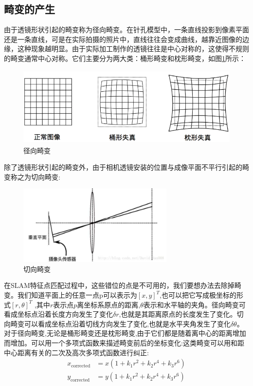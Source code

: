 \subsection{畸变的产生}
由于透镜形状引起的畸变称为径向畸变。在针孔模型中，一条直线投影到像素平面还是一条直线，可是在实际拍摄的照片中，直线往往会变成曲线，越靠近图像的边缘，这种现象越明显。由于实际加工制作的透镜往往是中心对称的，这使得不规则的畸变通常中心对称。它们主要分为两大类：桶形畸变和枕形畸变，如图\ref{jingxiangjibian}所示：
\begin{figure}
	\centering
	\includegraphics[height=4cm]{figures/jibian.png}
	\caption{径向畸变}\label{jingxiangjibian}
\end{figure}\par
除了透镜形状引起的畸变外，由于相机透镜安装的位置与成像平面不平行引起的畸变称之为切向畸变:
\begin{figure}
	\centering
	\includegraphics[height=4cm]{figures/qiexiangjibian.jpg}
	\caption{切向畸变}\label{qiexiangjibian}
\end{figure}\par
在SLAM特征点匹配过程中，这些错位的点是不可用的，我们要想办法去除掉畸变。我们知道平面上的任意一点p可以表示为$[x,y]^T$,也可以把它写成极坐标的形式$[r,\theta]^T$ ,其中$r$表示点$p$离坐标系原点的距离,$\theta$表示和水平轴的夹角。径向畸变可看成坐标点沿着长度方向发生了变化$\delta r$,也就是其距离原点的长度发生了变化。切向畸变可以看成坐标点沿着切线方向发生了变化,也就是水平夹角发生了变化$\delta \theta$。对于径向畸变,无论是桶形畸变还是枕形畸变,由于它们都是随着离中心的距离增加而增加。可以用一个多项式函数来描述畸变前后的坐标变化:这类畸变可以用和距中心距离有关的二次及高次多项式函数进行纠正:
\begin{equation}
\begin{aligned} x_{\text {corrected}} &=x\left(1+k_{1} r^{2}+k_{2} r^{4}+k_{3} r^{6}\right) \\ y_{\text {corrected}} &=y\left(1+k_{1} r^{2}+k_{2} r^{4}+k_{3} r^{6}\right) \end{aligned}
\end{equation}
